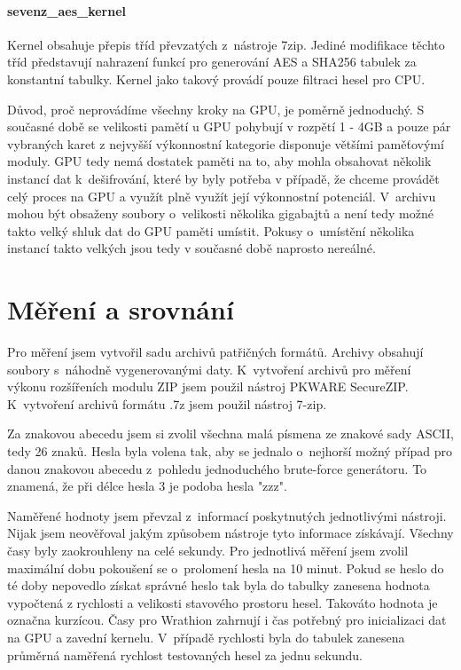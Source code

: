 \subsubsection{sevenz\_aes\_kernel}
Kernel obsahuje přepis tříd převzatých z~nástroje 7zip. Jediné modifikace těchto tříd představují
nahrazení funkcí pro generování AES a SHA256 tabulek za konstantní tabulky. Kernel jako
takový provádí pouze filtraci hesel pro CPU. 

Důvod, proč neprovádíme všechny kroky na GPU, je poměrně jednoduchý. S současné době se velikosti
pamětí u GPU pohybují v rozpětí 1 - 4GB a pouze pár vybraných karet z nejvyšší výkonnostní kategorie
disponuje většími paměťovýmí moduly. GPU tedy nemá dostatek paměti na to, aby mohla obsahovat
několik instancí dat k~dešifrování, které by byly potřeba v případě, že chceme provádět celý proces na
GPU a využít plně využít její výkonnostní potenciál. V~archivu mohou být obsaženy soubory
o~velikosti několika gigabajtů a není tedy možné takto velký shluk dat do GPU paměti umístit. Pokusy
o~umístění několika instancí takto velkých jsou tedy v současné době naprosto nereálné. 

\chapter{Měření a srovnání}
\label{ch:mereni_a_srovnani}
Pro měření jsem vytvořil sadu archivů patřičných formátů. Archivy obsahují soubory s~náhodně
vygenerovanými daty. K~vytvoření archivů pro měření výkonu rozšířeních modulu ZIP jsem použil
nástroj PKWARE SecureZIP. K~vytvoření archivů formátu .7z jsem použil nástroj 7-zip.

Za znakovou abecedu jsem si zvolil všechna malá písmena ze znakové sady ASCII, tedy 26 znaků.
Hesla byla volena tak, aby se jednalo o~nejhorší možný případ pro danou znakovou abecedu z~pohledu
jednoduchého brute-force generátoru. To znamená, že při délce hesla 3 je podoba hesla "zzz".

Naměřené hodnoty jsem převzal z~informací poskytnutých jednotlivými nástroji. Nijak jsem
neověřoval jakým způsobem nástroje tyto informace získávají. Všechny časy byly zaokrouhleny na
celé sekundy. Pro jednotlivá měření jsem zvolil maximální dobu pokoušení se o~prolomení hesla na
10 minut. Pokud se heslo do té doby nepovedlo získat správné heslo tak byla do tabulky zanesena
hodnota vypočtená z rychlosti a velikosti stavového prostoru hesel. Takováto hodnota je označna
kurzícou. Časy pro Wrathion zahrnují i čas potřebný pro inicializaci dat na GPU a zavední
kernelu. V~případě rychlosti byla do tabulek zanesena průměrná naměřená rychlost testovaných
hesel za jednu sekundu.

